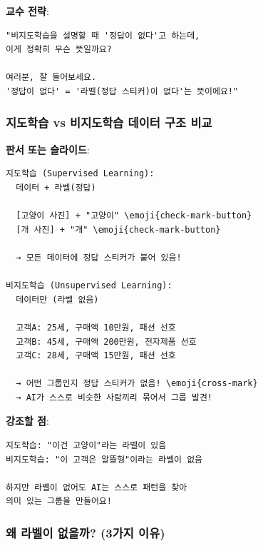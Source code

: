 \documentclass[a4paper, 11pt]{article}
\begin{document}
\textbf{교수 전략}:

\begin{verbatim}
"비지도학습을 설명할 때 '정답이 없다'고 하는데,
이게 정확히 무슨 뜻일까요?

여러분, 잘 들어보세요.
'정답이 없다' = '라벨(정답 스티커)이 없다'는 뜻이에요!"
\end{verbatim}

\hypertarget{uxc9c0uxb3c4uxd559uxc2b5-vs-uxbe44uxc9c0uxb3c4uxd559uxc2b5-uxb370uxc774uxd130-uxad6cuxc870-uxbe44uxad50}{%
\subsubsection{지도학습 vs 비지도학습 데이터 구조
비교}\label{uxc9c0uxb3c4uxd559uxc2b5-vs-uxbe44uxc9c0uxb3c4uxd559uxc2b5-uxb370uxc774uxd130-uxad6cuxc870-uxbe44uxad50}}

\textbf{판서 또는 슬라이드}:

\begin{verbatim}
지도학습 (Supervised Learning):
  데이터 + 라벨(정답)

  [고양이 사진] + "고양이" \emoji{check-mark-button}
  [개 사진] + "개" \emoji{check-mark-button}
  
  → 모든 데이터에 정답 스티커가 붙어 있음!

비지도학습 (Unsupervised Learning):
  데이터만 (라벨 없음)

  고객A: 25세, 구매액 10만원, 패션 선호
  고객B: 45세, 구매액 200만원, 전자제품 선호
  고객C: 28세, 구매액 15만원, 패션 선호
  
  → 어떤 그룹인지 정답 스티커가 없음! \emoji{cross-mark}
  → AI가 스스로 비슷한 사람끼리 묶어서 그룹 발견!
\end{verbatim}

\textbf{강조할 점}:

\begin{verbatim}
지도학습: "이건 고양이"라는 라벨이 있음
비지도학습: "이 고객은 알뜰형"이라는 라벨이 없음

하지만 라벨이 없어도 AI는 스스로 패턴을 찾아
의미 있는 그룹을 만들어요!
\end{verbatim}

\hypertarget{uxc65c-uxb77cuxbca8uxc774-uxc5c6uxc744uxae4c-3uxac00uxc9c0-uxc774uxc720}{%
\subsubsection{왜 라벨이 없을까? (3가지
이유)}\label{uxc65c-uxb77cuxbca8uxc774-uxc5c6uxc744uxae4c-3uxac00uxc9c0-uxc774uxc720}}
\end{document}
